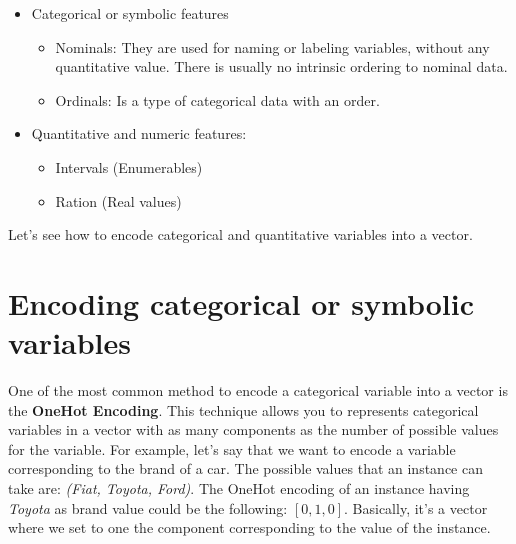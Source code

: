 \begin{itemize}
    \item Categorical or symbolic features
    \begin{itemize}
        \item Nominals: They are used for naming or labeling variables, without any quantitative value. There is usually no intrinsic ordering to nominal data.

        \item Ordinals: Is a type of categorical data with an order.
    \end{itemize}

    \item Quantitative and numeric features:
    \begin{itemize}
        \item Intervals (Enumerables)
        \item Ration (Real values)
    \end{itemize}
\end{itemize}
Let's see how to encode categorical and quantitative variables into a vector.

\section{Encoding categorical or symbolic variables}
One of the most common method to encode a categorical variable into a vector is the \textbf{OneHot Encoding}. This technique allows you to represents categorical variables in a vector with as many components as the number of possible values for the variable.\newline\newline
For example, let's say that we want to encode a variable corresponding to the brand of a car. The possible values that an instance can take are: \textit{(Fiat, Toyota, Ford)}. The OneHot encoding of an instance having \textit{Toyota} as brand value could be the following: $[0, 1, 0]$. Basically, it's a vector where we set to one the component corresponding to the value of the instance.

